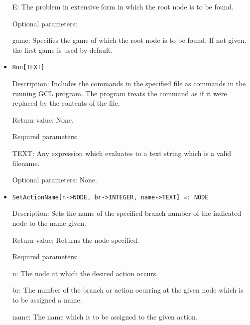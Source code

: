 \begin{itemize}
\bd
\item
[E:] The problem in extensive form in which the root node is to be
found.
\ed

\item
[Optional parameters:]\hfil\null

\bd
\item
[game:] Specifies the game of which the root node is to be found.  If
not given, the first game is used by default.
\ed
\ed

\item

\protect \large \begin{verbatim}
Run[TEXT]
\end{verbatim}\normalsize

\bd
\item
[Description:] Includes the commands in the specified file as commands
in the running GCL program.  The program treats the command as if it
were replaced by the contents of the file.
\item
[Return value:] None.
\item
[Required parameters:]\hfil\null
	
\bd
\item
[TEXT:] Any expression which evaluates to a text string which is a
valid filename.
\ed

\item
[Optional parameters:] None.
\ed


\item

\protect \large \begin{verbatim}
SetActionName[n->NODE, br->INTEGER, name->TEXT] =: NODE
\end{verbatim}\normalsize

\bd
\item
[Description:] Sets the name of the specified branch number of the
indicated node to the name given.
\item
[Return value:] Returns the node specified.
\item
[Required parameters:]\hfil\null
	
\bd
\item
[n:] The node at which the desired action occurs.
\item
[br:] The number of the branch or action ocurring at the given node
which is to be assigned a name.
\item
[name:] The name which is to be assigned to the given action.
\ed


\end{itemize}
